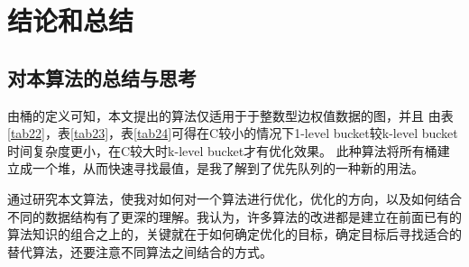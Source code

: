 \chapter{结论和总结}
\section{对本算法的总结与思考}
由桶的定义可知，本文提出的算法仅适用于于整数型边权值数据的图，并且
由表\ref{tab22}，表\ref{tab23}，表\ref{tab24}可得在C较小的情况下1-level bucket较k-level bucket时间复杂度更小，在C较大时k-level bucket才有优化效果。
此种算法将所有桶建立成一个堆，从而快速寻找最值，是我了解到了优先队列的一种新的用法。
\par
通过研究本文算法，使我对如何对一个算法进行优化，优化的方向，以及如何结合不同的数据结构有了更深的理解。我认为，许多算法的改进都是建立在前面已有的算法知识的组合之上的，关键就在于如何确定优化的目标，确定目标后寻找适合的替代算法，还要注意不同算法之间结合的方式。